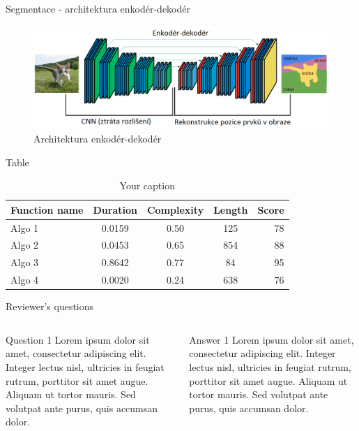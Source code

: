 \documentclass[aspectratio=1610]{beamer}
\begin{document}
\begin{frame}{Segmentace - architektura enkodér-dekodér}
\begin{figure}[h]
	\begin{center}
		\includegraphics[width=15cm, keepaspectratio]{segnet.png}
	\end{center}
	\caption{Architektura enkodér-dekodér} 	
\end{figure}
\end{frame}
\begin{frame}{Table}
\begin{center}
\begin{table}
\caption{Your caption}
\begin{tabular}{l | c | c | c | r}
\textbf{Function name} & \textbf{Duration} & \textbf{Complexity} & \textbf{Length} & \textbf{Score}\\
\hline \hline
Algo 1 & 0.0159 & 0.50 & 125 & 78 \\
Algo 2 & 0.0453 & 0.65 & 854 & 88 \\
Algo 3 & 0.8642 & 0.77 &  84 & 95 \\
Algo 4 & 0.0020 & 0.24 & 638 & 76 \\
\end{tabular}
\end{table}
\end{center}
\end{frame}
\begin{frame}{Reviewer's questions}
\begin{columns}
\begin{exampleblock}{Question 1}
Lorem ipsum dolor sit amet, consectetur adipiscing elit. Integer lectus nisl, ultricies in feugiat rutrum, porttitor sit amet augue. Aliquam ut tortor mauris. Sed volutpat ante purus, quis accumsan dolor.
\end{exampleblock}

\begin{block}{Answer 1}
Lorem ipsum dolor sit amet, consectetur adipiscing elit. Integer lectus nisl, ultricies in feugiat rutrum, porttitor sit amet augue. Aliquam ut tortor mauris. Sed volutpat ante purus, quis accumsan dolor.
\end{block}
\end{columns}
\end{frame}

\end{document}
